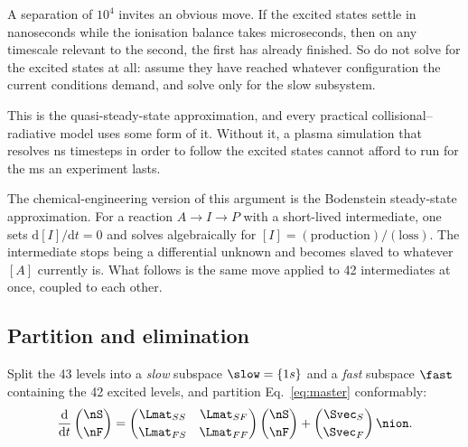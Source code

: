 A separation of $10^{4}$ invites an obvious move. If the excited states settle
in nanoseconds while the ionisation balance takes microseconds, then on any
timescale relevant to the second, the first has already finished. So do not
solve for the excited states at all: assume they have reached whatever
configuration the current conditions demand, and solve only for the slow
subsystem.

This is the quasi-steady-state approximation, and every practical
collisional--radiative model uses some form of it. Without it, a plasma
simulation that resolves \si{\nano\second} timesteps in order to follow the
excited states cannot afford to run for the \si{\milli\second} an experiment
lasts.

The chemical-engineering version of this argument is the Bodenstein
steady-state approximation. For a reaction $A \to I \to P$ with a short-lived
intermediate, one sets $\mathrm{d}[I]/\mathrm{d}t = 0$ and solves algebraically
for $[I] = (\text{production})/(\text{loss})$. The intermediate stops being a
differential unknown and becomes slaved to whatever $[A]$ currently is. What
follows is the same move applied to 42 intermediates at once, coupled to each
other.

\subsection{Partition and elimination}

Split the 43 levels into a \emph{slow} subspace $\slow = \{1s\}$ and a
\emph{fast} subspace $\fast$ containing the 42 excited levels, and partition
Eq.~\eqref{eq:master} conformably:
\begin{equation}
  \frac{\mathrm{d}}{\mathrm{d}t}
  \begin{pmatrix}\nS\\[2pt]\nF\end{pmatrix}
  =
  \begin{pmatrix}
    \Lmat_{SS} & \Lmat_{SF}\\[2pt]
    \Lmat_{FS} & \Lmat_{FF}
  \end{pmatrix}
  \begin{pmatrix}\nS\\[2pt]\nF\end{pmatrix}
  +
  \begin{pmatrix}\Svec_S\\[2pt]\Svec_F\end{pmatrix}\nion .
  \label{eq:partitioned}
\end{equation}

